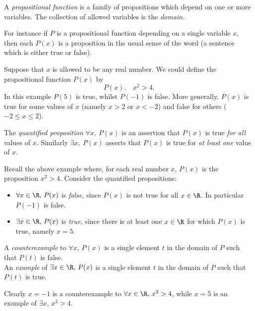 \begin{defn}
A \emph{propositional function} is a family of propositions which depend on one or more variables. The collection of allowed variables is the \emph{domain.}
\end{defn}

\noindent For instance if $P$ is a propositional function depending on a single variable $x$, then each $P(x)$ is a proposition in the usual sense of the word (a sentence which is either true or false).

\begin{example}
Suppose that $x$ is allowed to be any real number. We could define the propositional function $P(x)$ by
\[P(x).\quad x^2>4.\]
In this example $P(5)$ is true, whilst $P(-1)$ is false. More generally, $P(x)$ is true for some values of $x$ (namely $x>2$ or $x<-2$) and false for others ($-2\le x\le 2$).
\end{example}

\begin{defn}
The \emph{quantified proposition} $\forall x,\ P(x)$ is an assertion that $P(x)$ is true \emph{for all} values of $x$. Similarly $\exists x,\ P(x)$ asserts that $P(x)$ is true for \emph{at least one} value of $x$.
\end{defn}

\begin{example}
Recall the above example where, for each real number $x$, $P(x)$ is the proposition $x^2>4$. Consider the quantified propositions:
\begin{itemize}
  \item $\forall x\in\R,\, P(x)$ is \emph{false,} since $P(x)$ is not true for all $x\in\R$. In particular $P(-1)$ is false.
  \item $\exists x\in\R,\, P(x)$ is \emph{true,} since there is at least one $x\in\R$ for which $P(x)$ is true, namely $x=5$.
\end{itemize}
\end{example}

\begin{defn}
A \emph{counterexample} to $\forall x,\, P(x)$ is a single element $t$ in the domain of $P$ such that $P(t)$ is false.\\
An \emph{example} of $\exists x\in\R,\, P(x)$ is a single element $t$ in the domain of $P$ such that $P(t)$ is true.
\end{defn}

\noindent Clearly $x=-1$ is a counterexample to $\forall x\in\R,\,x^2>4$, while $x=5$ is an example of $\exists x,\,x^2>4$.

